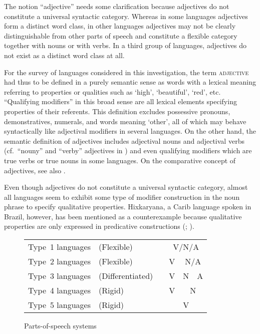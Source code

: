 The notion “adjective” needs some clarification because adjectives do not constitute a universal syntactic category. Whereas in some languages adjectives form a distinct word class, in other languages adjectives may not be clearly distinguishable from other parts of speech and constitute a flexible category together with nouns or with verbs. In a third group of languages, adjectives do not exist as a distinct word class at all.

For the survey of languages considered in this investigation, the term \textsc{adjective} had thus to be defined in a purely semantic sense as words with a lexical meaning referring to properties or qualities such as ‘high’, ‘beautiful’, ‘red’, etc. “Qualifying modifiers” \citep[100, passim]{rijkhoff2002} in this broad sense are all lexical elements specifying properties of their referents. This definition excludes possessive pronouns, demonstratives, numerals, and words meaning ‘other’, all of which may behave syntactically like adjectival modifiers in several languages. On the other hand, the semantic definition of adjectives includes adjectival nouns and adjectival verbs (cf.~“nouny” and “verby” adjectives in \citealt[25–34, passim]{wetzer1996}) and even qualifying modifiers which are true verbs or true nouns in some languages. On the comparative concept of adjectives, see also \citet[670]{haspelmath2010b}. 

Even though adjectives do not constitute a universal syntactic category, almost all languages seem to exhibit some type of modifier construction in the noun phrase to specify qualitative properties. Hixkaryana, a Carib language spoken in Brazil, however, has been mentioned as a counterexample because qualitative properties are only expressed in predicative constructions (\citealt[37, 131]{derbyshire1979}; \citealt[138]{rijkhoff2002}).

\begin{figure}
\begin{tabular}{ llp{1cm} | c | c | c |}
\cline{4-6}
Type~1 languages &(Flexible)&&\multicolumn{3}{c|}{V/N/A \rule{0pt}{1.3em}}\\
\cline{4-6}
Type~2 languages &(Flexible)&&V&\multicolumn{2}{c|}{N/A \rule{0pt}{1.3em}}\\
\cline{4-6}
Type~3 languages &(Differentiated)&&V&N&A \rule{0pt}{1.3em}\\
\cline{4-6}
Type~4 languages &(Rigid)&&V&\multicolumn{2}{c|}{N \rule{0pt}{1.3em}}\\
\cline{4-6}
Type~5 languages &(Rigid)&&\multicolumn{3}{c|}{V \rule{0pt}{1.3em}}\\ 
\cline{4-6}
\end{tabular}
\caption[Parts-of-speech systems]{Parts-of-speech systems \citep[based on][]{hengeveld-etal2004}}
\label{hengeveld adj}
\end{figure}

